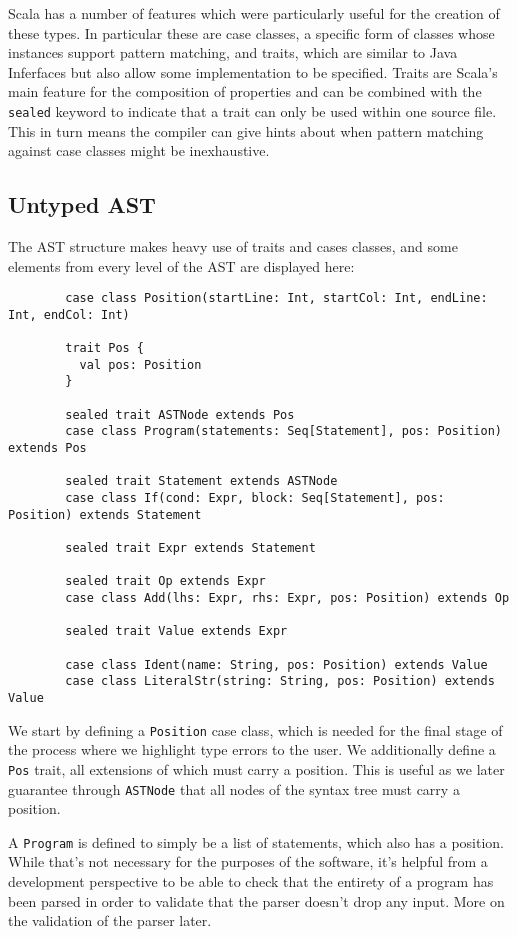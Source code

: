 \documentclass[british, twoside]{bhamthesis}
\theoremstyle{definition}
\begin{document}
    Scala has a number of features which were particularly useful for the creation of these types. In particular these are case classes, a specific form of classes whose instances support pattern matching, and traits, which are similar to Java Inferfaces but also allow some implementation to be specified. Traits are Scala's main feature for the composition of properties and can be combined with the \texttt{sealed} keyword to indicate that a trait can only be used within one source file. This in turn means the compiler can give hints about when pattern matching against case classes might be inexhaustive.

    \subsection{Untyped AST}
      The AST structure makes heavy use of traits and cases classes, and some elements from every level of the AST are displayed here:
      \begin{lstlisting}
        case class Position(startLine: Int, startCol: Int, endLine: Int, endCol: Int)

        trait Pos {
          val pos: Position
        }

        sealed trait ASTNode extends Pos
        case class Program(statements: Seq[Statement], pos: Position) extends Pos

        sealed trait Statement extends ASTNode
        case class If(cond: Expr, block: Seq[Statement], pos: Position) extends Statement

        sealed trait Expr extends Statement

        sealed trait Op extends Expr
        case class Add(lhs: Expr, rhs: Expr, pos: Position) extends Op

        sealed trait Value extends Expr

        case class Ident(name: String, pos: Position) extends Value
        case class LiteralStr(string: String, pos: Position) extends Value
      \end{lstlisting}

      We start by defining a \texttt{Position} case class, which is needed for the final stage of the process where we highlight type errors to the user. We additionally define a \texttt{Pos} trait, all extensions of which must carry a position. This is useful as we later guarantee through \texttt{ASTNode} that all nodes of the syntax tree must carry a position.

      A \texttt{Program} is defined to simply be a list of statements, which also has a position. While that's not necessary for the purposes of the software, it's helpful from a development perspective to be able to check that the entirety of a program has been parsed in order to validate that the parser doesn't drop any input. More on the validation of the parser later.
\end{document}
